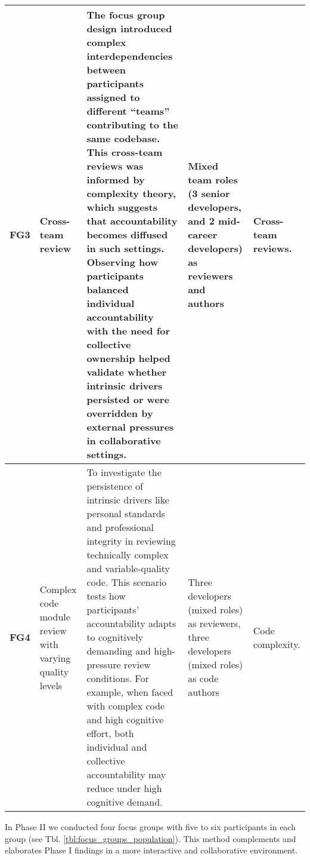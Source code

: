 {\begin{landscape}
\begin{longtable}{lp{3.5cm}p{6.5cm}p{5.5cm}p{2cm}}
        \multirow{6}{0.5cm}{\textbf{FG3}} & \multirow{6}{3cm}{Cross-team review} & The focus group design introduced complex interdependencies between participants assigned to different ``teams'' contributing to the same codebase. This cross-team reviews was informed by complexity theory, which suggests that accountability becomes diffused in such settings. Observing how participants balanced individual accountability with the need for collective ownership helped validate whether intrinsic drivers persisted or were overridden by external pressures in collaborative settings. & Mixed team roles (3 senior developers, and 2 mid-career developers) as reviewers and authors & Cross-team reviews. \\
        
        \hline
        
        \multirow{6}{0.5cm}{\textbf{FG4}} & \multirow{6}{3cm}{Complex code module review with varying quality levels} & To investigate the persistence of intrinsic drivers like personal standards and professional integrity in reviewing technically complex and variable-quality code. This scenario tests how participants' accountability adapts to cognitively demanding and high-pressure review conditions. For example, when faced with complex code and high cognitive effort, both individual and collective accountability may reduce under high cognitive demand. & Three developers (mixed roles) as reviewers, three developers (mixed roles) as code authors & Code complexity. \\
        
        \bottomrule
    
    \end{longtable}

\end{landscape}

}

In Phase II we conducted four focus groups with five to six participants in each group (see Tbl. \ref{tbl:focus_groups_population}). This method complements and elaborates Phase I findings in a more interactive and collaborative environment. 

